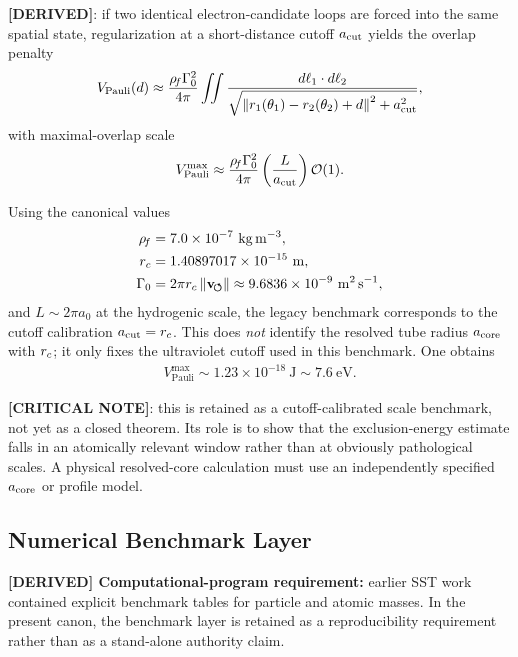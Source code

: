 \textbf{[DERIVED]}: if two identical electron-candidate loops are forced into the same spatial state, regularization at a short-distance cutoff $a_{\rm cut}$ yields the overlap penalty
\begin{align}
    V_{\mathrm{Pauli}}(d)
    \approx
    \frac{\rho_{\!f}\Gamma_0^2}{4\pi}
    \iint
    \frac{d\ell_1\cdot d\ell_2}{\sqrt{\norm{r_1(\theta_1)-r_2(\theta_2)+d}^2+a_{\rm cut}^2}},
\end{align}
with maximal-overlap scale
\begin{align}
    V_{\mathrm{Pauli}}^{\max}
    \approx
    \frac{\rho_{\!f}\Gamma_0^2}{4\pi}\left(\frac{L}{a_{\rm cut}}\right)\mathcal{O}(1).
\end{align}

Using the canonical values
\begin{align}
    \rhoF &= 7.0\times 10^{-7}\ \mathrm{kg\,m^{-3}}, \\
    \rc &= 1.40897017\times 10^{-15}\ \mathrm{m}, \\
    \Gamma_0 &= 2\pi \rc\,\vnorm \approx 9.6836\times 10^{-9}\ \mathrm{m^2\,s^{-1}},
\end{align}
and \(L\sim 2\pi a_0\) at the hydrogenic scale, the legacy benchmark corresponds to the cutoff calibration \(a_{\rm cut}=r_c\). This does \emph{not} identify the resolved tube radius \(a_{\rm core}\) with \(r_c\); it only fixes the ultraviolet cutoff used in this benchmark. One obtains
\begin{align}
    V_{\mathrm{Pauli}}^{\max} \sim 1.23\times 10^{-18}\ \mathrm{J} \sim 7.6\ \mathrm{eV}.
\end{align}

\textbf{[CRITICAL NOTE]}: this is retained as a cutoff-calibrated scale benchmark, not yet as a closed theorem. Its role is to show that the exclusion-energy estimate falls in an atomically relevant window rather than at obviously pathological scales. A physical resolved-core calculation must use an independently specified \(a_{\rm core}\) or profile model.

\subsection{Numerical Benchmark Layer}
\textbf{[DERIVED] Computational-program requirement:} earlier SST work contained explicit benchmark tables for particle and atomic masses. In the present canon, the benchmark layer is retained as a reproducibility requirement rather than as a stand-alone authority claim.

